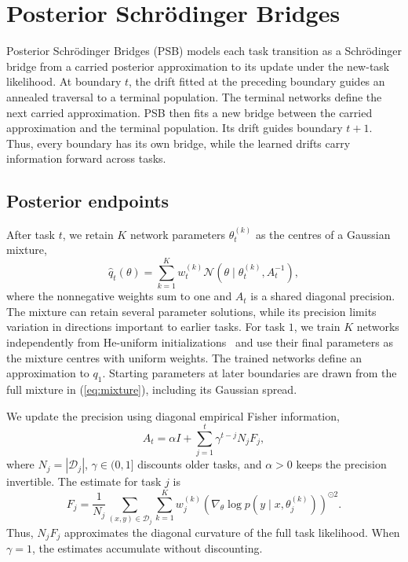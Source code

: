 \section{Posterior Schr\"odinger Bridges}
\label{sec:method}

Posterior Schr\"odinger Bridges (PSB) models each task transition as a
Schr\"odinger bridge from a carried posterior approximation to its update
under the new-task likelihood. At boundary $t$, the drift fitted at the
preceding boundary guides an annealed traversal to a terminal population.
The terminal networks define the next carried approximation. PSB then fits
a new bridge between the carried approximation and the terminal population.
Its drift guides boundary $t+1$. Thus, every boundary has its own bridge,
while the learned drifts carry information forward across tasks.

\subsection{Posterior endpoints}
\label{sec:representation}

After task $t$, we retain $K$ network parameters $\theta_t^{(k)}$ as the
centres of a Gaussian mixture,
\begin{equation}
    \hat q_t(\theta)=\sum_{k=1}^{K}w_t^{(k)}
    \mathcal{N}\!\left(\theta\mid\theta_t^{(k)},A_t^{-1}\right),
    \label{eq:mixture}
\end{equation}
where the nonnegative weights sum to one and $A_t$ is a shared diagonal
precision. The mixture can retain several parameter solutions, while its
precision limits variation in directions important to earlier tasks. For
task $1$, we train $K$ networks independently from He-uniform
initializations~\cite{he2015delving} and use their final parameters as the
mixture centres with uniform weights. The trained networks define an
approximation to $q_1$. Starting parameters at later boundaries are drawn
from the full mixture in (\ref{eq:mixture}), including its Gaussian spread.

We update the precision using diagonal empirical Fisher information,
\begin{equation}
    A_t=\alpha I+\sum_{j=1}^{t}\gamma^{t-j}N_jF_j,
    \label{eq:precision}
\end{equation}
where $N_j=|\mathcal{D}_j|$, $\gamma\in(0,1]$ discounts older tasks, and
$\alpha>0$ keeps the precision invertible. The estimate for task $j$ is
\begin{equation}
    F_j=\frac{1}{N_j}\sum_{(x,y)\in\mathcal{D}_j}\sum_{k=1}^{K}w_j^{(k)}
    \left(\nabla_\theta\log p(y\mid x,\theta_j^{(k)})\right)^{\odot2}.
    \label{eq:fisher}
\end{equation}
Thus, $N_jF_j$ approximates the diagonal curvature of the full task
likelihood. When $\gamma=1$, the estimates accumulate without discounting.

